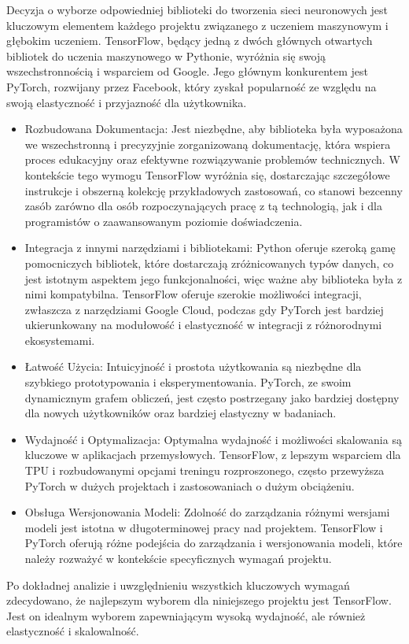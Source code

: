\documentclass[a4paper,twoside,12pt]{book}
\begin{document}
Decyzja o wyborze odpowiedniej biblioteki do tworzenia sieci neuronowych jest kluczowym elementem każdego projektu związanego z uczeniem maszynowym i głębokim uczeniem. TensorFlow, będący jedną z dwóch głównych otwartych bibliotek do uczenia maszynowego w Pythonie, wyróżnia się swoją wszechstronnością i wsparciem od Google. Jego głównym konkurentem jest PyTorch, rozwijany przez Facebook, który zyskał popularność ze względu na swoją elastyczność i przyjazność dla użytkownika.
\begin{itemize}
  \item Rozbudowana Dokumentacja: Jest niezbędne, aby biblioteka była wyposażona we wszechstronną i precyzyjnie zorganizowaną dokumentację, która wspiera proces edukacyjny oraz efektywne rozwiązywanie problemów technicznych. W kontekście tego wymogu TensorFlow wyróżnia się, dostarczając szczegółowe instrukcje i obszerną kolekcję przykładowych zastosowań, co stanowi bezcenny zasób zarówno dla osób rozpoczynających pracę z tą technologią, jak i dla programistów o zaawansowanym poziomie doświadczenia.
  \item Integracja z innymi narzędziami i bibliotekami: Python oferuje szeroką gamę pomocniczych bibliotek, które dostarczają zróżnicowanych typów danych, co jest istotnym aspektem jego funkcjonalności, więc ważne aby biblioteka była z nimi kompatybilna. TensorFlow oferuje szerokie możliwości integracji, zwłaszcza z narzędziami Google Cloud\cite{bib:COLAB}, podczas gdy PyTorch jest bardziej ukierunkowany na modułowość i elastyczność w integracji z różnorodnymi ekosystemami.
  \item Łatwość Użycia: Intuicyjność i prostota użytkowania są niezbędne dla szybkiego prototypowania i eksperymentowania. PyTorch, ze swoim dynamicznym grafem obliczeń, jest często postrzegany jako bardziej dostępny dla nowych użytkowników oraz bardziej elastyczny w badaniach.
  \item Wydajność i Optymalizacja: Optymalna wydajność i możliwości skalowania są kluczowe w aplikacjach przemysłowych. TensorFlow, z lepszym wsparciem dla TPU\cite{bib:TPU} i rozbudowanymi opcjami treningu rozproszonego, często przewyższa PyTorch w dużych projektach i zastosowaniach o dużym obciążeniu.
  \item Obsługa Wersjonowania Modeli: Zdolność do zarządzania różnymi wersjami modeli jest istotna w długoterminowej pracy nad projektem. TensorFlow i PyTorch oferują różne podejścia do zarządzania i wersjonowania modeli, które należy rozważyć w kontekście specyficznych wymagań projektu.
\end{itemize}
Po dokładnej analizie i uwzględnieniu wszystkich kluczowych wymagań zdecydowano, że najlepszym wyborem dla niniejszego projektu jest TensorFlow. Jest on idealnym wyborem zapewniającym wysoką wydajność, ale również elastyczność i skalowalność.
\end{document}
